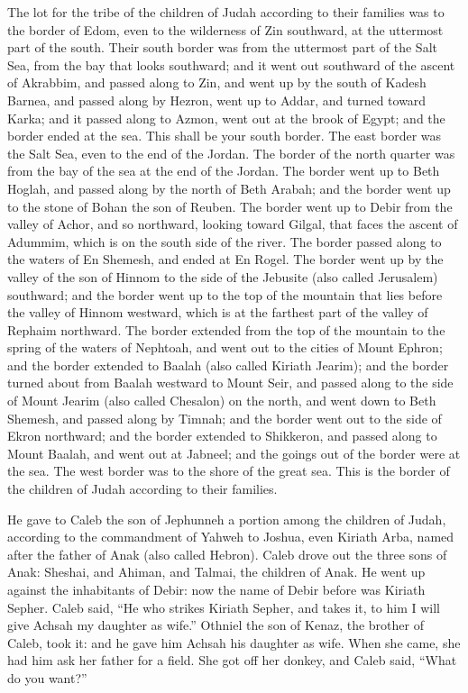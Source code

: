  The lot for the tribe of the children of Judah according
to their families was to the border of Edom, even to the wilderness of
Zin southward, at the uttermost part of the south.  Their
south border was from the uttermost part of the Salt Sea, from the bay
that looks southward;  and it went out southward of the
ascent of Akrabbim, and passed along to Zin, and went up by the south of
Kadesh Barnea, and passed along by Hezron, went up to Addar, and turned
toward Karka;  and it passed along to Azmon, went out at
the brook of Egypt; and the border ended at the sea. This shall be your
south border.  The east border was the Salt Sea, even to
the end of the Jordan. The border of the north quarter was from the bay
of the sea at the end of the Jordan.  The border went up
to Beth Hoglah, and passed along by the north of Beth Arabah; and the
border went up to the stone of Bohan the son of Reuben. 
The border went up to Debir from the valley of Achor, and so northward,
looking toward Gilgal, that faces the ascent of Adummim, which is on the
south side of the river. The border passed along to the waters of En
Shemesh, and ended at En Rogel.  The border went up by the
valley of the son of Hinnom to the side of the Jebusite (also called
Jerusalem) southward; and the border went up to the top of the mountain
that lies before the valley of Hinnom westward, which is at the farthest
part of the valley of Rephaim northward.  The border
extended from the top of the mountain to the spring of the waters of
Nephtoah, and went out to the cities of Mount Ephron; and the border
extended to Baalah (also called Kiriath Jearim);  and the
border turned about from Baalah westward to Mount Seir, and passed along
to the side of Mount Jearim (also called Chesalon) on the north, and
went down to Beth Shemesh, and passed along by Timnah; 
and the border went out to the side of Ekron northward; and the border
extended to Shikkeron, and passed along to Mount Baalah, and went out at
Jabneel; and the goings out of the border were at the sea.
 The west border was to the shore of the great sea. This
is the border of the children of Judah according to their families.

 He gave to Caleb the son of Jephunneh a portion among
the children of Judah, according to the commandment of Yahweh to Joshua,
even Kiriath Arba, named after the father of Anak (also called Hebron).
 Caleb drove out the three sons of Anak: Sheshai, and
Ahiman, and Talmai, the children of Anak.  He went up
against the inhabitants of Debir: now the name of Debir before was
Kiriath Sepher.  Caleb said, ``He who strikes Kiriath
Sepher, and takes it, to him I will give Achsah my daughter as wife.''
 Othniel the son of Kenaz, the brother of Caleb, took it:
and he gave him Achsah his daughter as wife.  When she
came, she had him ask her father for a field. She got off her donkey,
and Caleb said, ``What do you want?''

